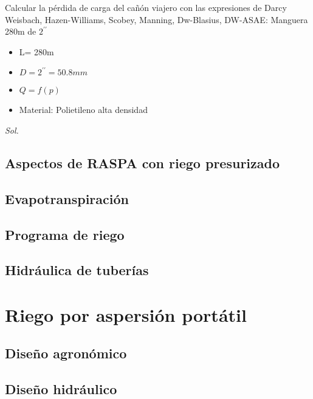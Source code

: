 \begin{example}
    Calcular la pérdida de carga del cañón viajero con las expresiones de Darcy Weisbach, Hazen-Williams, Scobey, Manning, Dw-Blasius, DW-ASAE: Manguera 280m de $2^{\prime\prime}$
    \begin{itemize}
        \item L= 280m
        \item $D= 2^{\prime\prime} = 50.8mm$
        \item $Q= f(p)$
        \item Material: Polietileno alta densidad
    \end{itemize}
    \textit{ Sol. }    
\end{example}



\subsection{Aspectos de RASPA con riego presurizado}
\subsection{Evapotranspiración}
\subsection{Programa de riego}
\subsection{Hidráulica de tuberías}


\section{Riego por aspersión portátil}
\subsection{Diseño agronómico}
\subsection{Diseño hidráulico}













